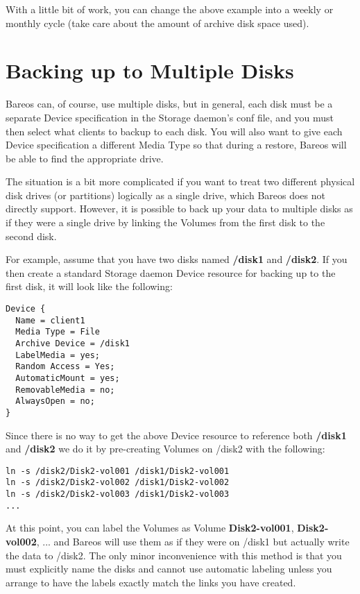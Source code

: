 With a little bit of work, you can change the above example into a weekly or
monthly cycle (take care about the amount of archive disk space used).

\label{MultipleDisks}
\section{Backing up to Multiple Disks}

Bareos can, of course, use multiple disks, but in general, each disk must be a
separate Device specification in the Storage daemon's conf file, and you must
then select what clients to backup to each disk. You will also want to
give each Device specification a different Media Type so that during
a restore, Bareos will be able to find the appropriate drive.

The situation is a bit more complicated if you want to treat two different
physical disk drives (or partitions) logically as a single drive, which
Bareos does not directly support.  However, it is possible to back up your
data to multiple disks as if they were a single drive by linking the
Volumes from the first disk to the second disk.

For example, assume that you have two disks named {\bf /disk1} and {\bf
/disk2}. If you then create a standard Storage daemon Device resource for
backing up to the first disk, it will look like the following:

\footnotesize
\begin{verbatim}
Device {
  Name = client1
  Media Type = File
  Archive Device = /disk1
  LabelMedia = yes;
  Random Access = Yes;
  AutomaticMount = yes;
  RemovableMedia = no;
  AlwaysOpen = no;
}
\end{verbatim}
\normalsize

Since there is no way to get the above Device resource to reference both {\bf
/disk1} and {\bf /disk2} we do it by pre-creating Volumes on /disk2 with the
following:

\footnotesize
\begin{verbatim}
ln -s /disk2/Disk2-vol001 /disk1/Disk2-vol001
ln -s /disk2/Disk2-vol002 /disk1/Disk2-vol002
ln -s /disk2/Disk2-vol003 /disk1/Disk2-vol003
...
\end{verbatim}
\normalsize

At this point, you can label the Volumes as Volume {\bf Disk2-vol001}, {\bf
Disk2-vol002}, ... and Bareos will use them as if they were on /disk1 but
actually write the data to /disk2. The only minor inconvenience with this
method is that you must explicitly name the disks and cannot use automatic
labeling unless you arrange to have the labels exactly match the links you
have created.

